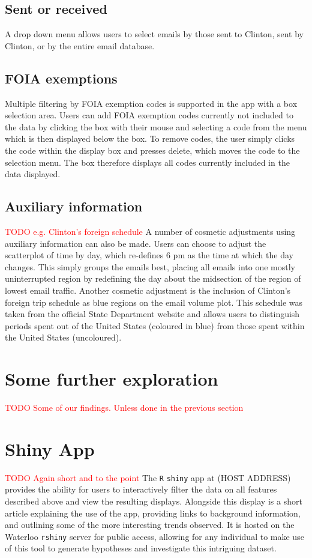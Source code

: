 \documentclass[journal]{vgtc}                %
\newcommand*{\TODO}[1]{\textcolor{red}{TODO #1}}
\begin{document}
\subsection{Sent or received}
A drop down menu allows users to select emails by those sent to Clinton, sent by Clinton, or by the entire email database.
\subsection{FOIA exemptions}
Multiple filtering by FOIA exemption codes is supported in the app with a box selection area. Users can add FOIA exemption codes currently not included to the data by clicking the box with their mouse and selecting a code from the menu which is then displayed below the box. To remove codes, the user simply clicks the code within the display box and presses delete, which moves the code to the selection menu. The box therefore displays all codes currently included in the data displayed.
\subsection{Auxiliary information}
\TODO{e.g. Clinton's foreign schedule}
A number of cosmetic adjustments using auxiliary information can also be made. Users can choose to adjust the scatterplot of time by day, which re-defines 6 pm as the time at which the day changes. This simply groups the emails best, placing all emails into one mostly uninterrupted region by redefining the day about the midsection of the region of lowest email traffic. Another cosmetic adjustment is the inclusion of Clinton's foreign trip schedule as blue regions on the email volume plot. This schedule was taken from the official State Department website \cite{ForeignSched} and allows users to distinguish periods spent out of the United States (coloured in blue) from those spent within the United States (uncoloured).
\section{Some further exploration}
\TODO{Some of our findings.  Unless done in the previous section}
\section{Shiny App}
\TODO{Again short and to the point}
The \texttt{R} \texttt{shiny} app at (HOST ADDRESS) provides the ability for users to interactively filter the data on all features described above and view the resulting displays. Alongside this display is a short article explaining the use of the app, providing links to background information, and outlining some of the more interesting trends observed. It is hosted on the Waterloo \texttt{rshiny} server for public access, allowing for any individual to make use of this tool to generate hypotheses and investigate this intriguing dataset.
\end{document}
